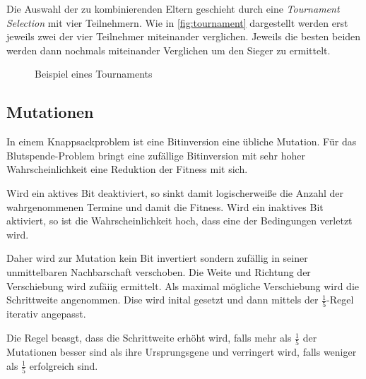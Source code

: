 Die Auswahl der zu kombinierenden Eltern geschieht durch eine \emph{Tournament Selection} mit vier Teilnehmern.
Wie in \autoref{fig:tournament} dargestellt werden erst jeweils zwei der vier Teilnehmer miteinander verglichen.
Jeweils die besten beiden werden dann nochmals miteinander Verglichen um den Sieger zu ermittelt.

\begin{figure}[h]
    \centering
    \caption{Beispiel eines Tournaments}
    \label{fig:tournament}
\end{figure}

\subsection{Mutationen}
In einem Knappsackproblem ist eine Bitinversion eine übliche Mutation.
Für das Blutspende-Problem bringt eine zufällige Bitinversion mit sehr hoher Wahrscheinlichkeit
eine Reduktion der Fitness mit sich.

Wird ein aktives Bit deaktiviert, so sinkt damit logischerweiße die Anzahl der wahrgenommenen Termine und damit die Fitness.
Wird ein inaktives Bit aktiviert, so ist die Wahrscheinlichkeit hoch, dass eine der Bedingungen verletzt wird.

Daher wird zur Mutation kein Bit invertiert sondern zufällig in seiner unmittelbaren Nachbarschaft verschoben.
Die Weite und Richtung der Verschiebung wird zufäiig ermittelt. Als maximal mögliche Verschiebung wird die Schrittweite angenommen.
Dise wird inital gesetzt und dann mittels der $\frac{1}{5}$-Regel iterativ angepasst.

Die Regel beasgt, dass die Schrittweite erhöht wird, falls mehr als $\frac{1}{5}$ der Mutationen besser sind als ihre Ursprungsgene
und verringert wird, falls weniger als $\frac{1}{5}$ erfolgreich sind.

